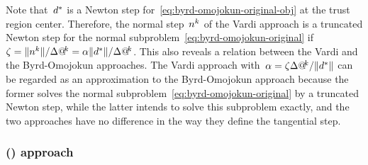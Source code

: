 Note that~$\step[\ast]$ is a Newton step for~\cref{eq:byrd-omojokun-original-obj} at the trust region center.
Therefore, the normal step~$\nstep[k]$ of the Vardi approach is a truncated Newton step for the normal subproblem~\cref{eq:byrd-omojokun-original} if~$\zeta = \norm{\nstep[k]} / \rad[k]  = \alpha \norm{\step[\ast]} / \rad[k]$.
This also reveals a relation between the Vardi and the Byrd-Omojokun approaches.
The Vardi approach with~$\alpha = \zeta \rad[k] / \norm{\step[\ast]}$ can be regarded as an approximation to the Byrd-Omojokun approach because the former solves the normal subproblem~\cref{eq:byrd-omojokun-original} by a truncated Newton step, while the latter intends to solve this subproblem exactly, and the two approaches have no difference in the way they define the tangential step.

\subsubsection{ () approach}

